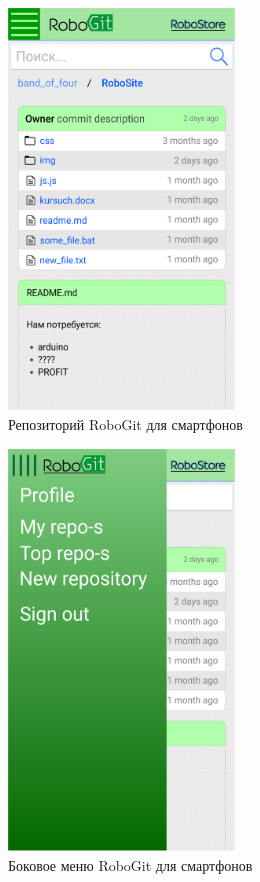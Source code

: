\documentclass[12pt, a4paper]{article}
\begin{document}
\begin{figure}[H]
  \centering
  \includegraphics[width=6cm]{png/git_repo_smart.png}
  \caption{Репозиторий RoboGit для смартфонов}
\end{figure}

\begin{figure}[H]
  \centering
  \includegraphics[width=6cm]{png/git_menu_smart.png}
  \caption{Боковое меню RoboGit для смартфонов}
\end{figure}
\end{document}
